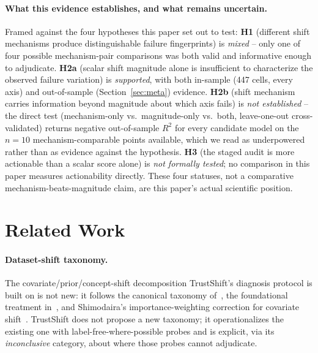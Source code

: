 \documentclass[11pt]{article}
\begin{document}
\paragraph{What this evidence establishes, and what remains uncertain.} Framed against the four
hypotheses this paper set out to test: \textbf{H1} (different shift mechanisms produce
distinguishable failure fingerprints) is \emph{mixed} -- only one of four possible mechanism-pair
comparisons was both valid and informative enough to adjudicate. \textbf{H2a} (scalar shift
magnitude alone is insufficient to characterize the observed failure variation) is
\emph{supported}, with both in-sample (447 cells, every axis) and out-of-sample
(Section~\ref{sec:meta}) evidence. \textbf{H2b} (shift mechanism carries information beyond
magnitude about which axis fails) is \emph{not established} -- the direct test (mechanism-only vs.\
magnitude-only vs.\ both, leave-one-out cross-validated) returns negative out-of-sample $R^2$ for
every candidate model on the $n=10$ mechanism-comparable points available, which we read as
underpowered rather than as evidence against the hypothesis. \textbf{H3} (the staged audit is more
actionable than a scalar score alone) is \emph{not formally tested}; no comparison in this paper
measures actionability directly. These four statuses, not a comparative mechanism-beats-magnitude
claim, are this paper's actual scientific position.

\section{Related Work}\label{sec:related}

\paragraph{Dataset-shift taxonomy.} The covariate/prior/concept-shift decomposition TrustShift's
diagnosis protocol is built on is not new: it follows the canonical taxonomy
of~\citet{morenotorres2012unifying}, the foundational treatment
in~\citet{quinonerocandela2009dataset}, and Shimodaira's importance-weighting correction for
covariate shift~\citep{shimodaira2000improving}. TrustShift does not propose a new taxonomy; it
operationalizes the existing one with label-free-where-possible probes and is explicit, via its
\emph{inconclusive} category, about where those probes cannot adjudicate.
\end{document}
